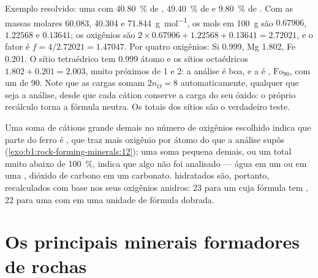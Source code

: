 Exemplo resolvido: uma  com \qty{40.80}{\percent} de ,
\qty{49.40}{\percent} de  e \qty{9.80}{\percent} de . Com as
massas molares \num{60.083}, \num{40.304} e \qty{71.844}{g.mol^{-1}}, os
mols em \qty{100}{g} são $0.67906$, $1.22568$ e $0.13641$; os
oxigênios são $2\times0.67906 + 1.22568 + 0.13641 = 2.72021$, e o fator é
$f = 4/2.72021 = 1.47047$. Por quatro oxigênios: Si \num{0.999}, Mg \num{1.802},
Fe \num{0.201}. O sítio tetraédrico tem \num{0.999} átomo e os
sítios octaédricos $1.802 + 0.201 = 2.003$, muito próximos de 1 e 2: a análise é boa, e a  é , $\text{Fo}_{90}$,
com um  de 90. Note que as cargas somam $2n_O = 8$ automaticamente, qualquer que seja a análise, desde que cada cátion conserve a carga
do seu óxido: o próprio recálculo torna a fórmula neutra. Os totais dos
sítios são o verdadeiro teste.

Uma soma de cátions grande demais no número de oxigênios escolhido indica que parte do ferro é , que traz mais oxigênio por átomo do que a análise supôs (\cref{exo:b1:rock-forming-minerals:12}); uma soma pequena demais, ou um total muito abaixo de \qty{100}{\percent}, indica que algo não foi analisado --- água em um  ou em uma , dióxido de carbono em um carbonato.  hidratados são, portanto, recalculados com base nos seus oxigênios anidros: 23 para um  cuja fórmula tem , 22 para uma  com  em uma unidade de fórmula dobrada.

\section{Os principais minerais formadores de rochas}

